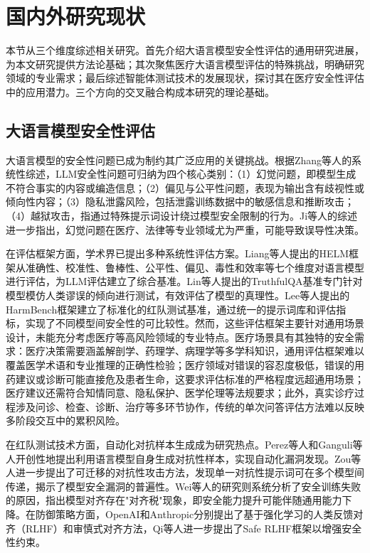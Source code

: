 \section{国内外研究现状}
\label{sec:related_work}

本节从三个维度综述相关研究。首先介绍大语言模型安全性评估的通用研究进展，为本文研究提供方法论基础；其次聚焦医疗大语言模型评估的特殊挑战，明确研究领域的专业需求；最后综述智能体测试技术的发展现状，探讨其在医疗安全性评估中的应用潜力。三个方向的交叉融合构成本研究的理论基础。

\subsection{大语言模型安全性评估}

大语言模型的安全性问题已成为制约其广泛应用的关键挑战。根据Zhang等人\cite{zhang2025safety,liu2024safety}的系统性综述，LLM安全性问题可归纳为四个核心类别：（1）幻觉问题，即模型生成不符合事实的内容或编造信息\cite{ji2023survey}；（2）偏见与公平性问题，表现为输出含有歧视性或倾向性内容\cite{bai2022training}；（3）隐私泄露风险，包括泄露训练数据中的敏感信息和推断攻击\cite{achiam2023gpt}；（4）越狱攻击，指通过特殊提示词设计绕过模型安全限制的行为\cite{wei2023jailbroken,zou2023universal}。Ji等人\cite{ji2023survey}的综述进一步指出，幻觉问题在医疗、法律等专业领域尤为严重，可能导致误导性决策。

在评估框架方面，学术界已提出多种系统性评估方案。Liang等人\cite{liang2022holistic}提出的HELM框架从准确性、校准性、鲁棒性、公平性、偏见、毒性和效率等七个维度对语言模型进行评估，为LLM评估建立了综合基准。Lin等人\cite{lin2022truthfulqa}提出的TruthfulQA基准专门针对模型模仿人类谬误的倾向进行测试，有效评估了模型的真理性。Lee等人\cite{mazeika2024harmbench}提出的HarmBench框架建立了标准化的红队测试基准，通过统一的提示词库和评估指标，实现了不同模型间安全性的可比较性。然而，这些评估框架主要针对通用场景设计，未能充分考虑医疗等高风险领域的专业特点\cite{zhang2025safety}。医疗场景具有其独特的安全需求：医疗决策需要涵盖解剖学、药理学、病理学等多学科知识，通用评估框架难以覆盖医学术语和专业推理的正确性检验；医疗领域对错误的容忍度极低，错误的用药建议或诊断可能直接危及患者生命，这要求评估标准的严格程度远超通用场景；医疗建议还需符合知情同意、隐私保护、医学伦理等法规要求\cite{esmai2025ethical}；此外，真实诊疗过程涉及问诊、检查、诊断、治疗等多环节协作，传统的单次问答评估方法难以反映多阶段交互中的累积风险\cite{inan2024safety}。

在红队测试技术方面，自动化对抗样本生成成为研究热点。Perez等人\cite{perez2022red}和Ganguli等人\cite{ganguli2022red}开创性地提出利用语言模型自身生成对抗性样本，实现自动化漏洞发现。Zou等人\cite{zou2023universal}进一步提出了可迁移的对抗性攻击方法，发现单一对抗性提示词可在多个模型间传递，揭示了模型安全漏洞的普遍性。Wei等人\cite{wei2023jailbroken}的研究则系统分析了安全训练失败的原因，指出模型对齐存在"对齐税"现象，即安全能力提升可能伴随通用能力下降。在防御策略方面，OpenAI\cite{team2024safety}和Anthropic\cite{guan2024deliberative}分别提出了基于强化学习的人类反馈对齐（RLHF）和审慎式对齐方法，Qi等人\cite{qi2023safe}进一步提出了Safe RLHF框架以增强安全性约束。

